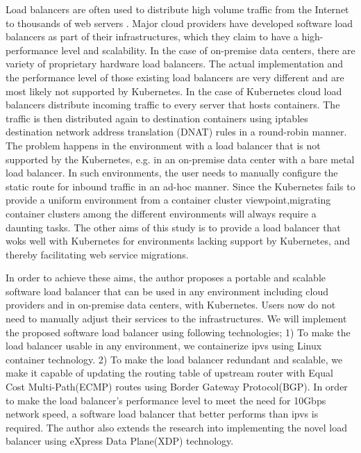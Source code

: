 Load balancers are often used to distribute high volume traffic from the Internet to thousands of web servers .
Major cloud providers have developed software load balancers\cite{eisenbud2016maglev,patel2013ananta} as part of their infrastructures, which they claim to have a high-performance level and scalability.
In the case of on-premise data centers, there are variety of proprietary hardware load balancers.
The actual implementation and the performance level of those existing load balancers are very different and are most likely not supported by Kubernetes.
%
In the case of Kubernetes cloud load balancers distribute incoming traffic to every server that hosts containers.
The traffic is then distributed again to destination containers using iptables destination 
network address translation (DNAT)\cite{MartinA.Brown2017,Marmol2015} rules in a round-robin manner. 
The problem happens in the environment with a load balancer that is not supported by the Kubernetes, e.g. in an on-premise data center with a bare metal load balancer. 
In such environments, the user needs to manually configure the static route for inbound traffic in an ad-hoc manner. 
Since the Kubernetes fails to provide a uniform environment from a container cluster viewpoint,migrating container clusters among the different environments will always require a daunting tasks.
The other aims of this study is to provide a load balancer that woks well with Kubernetes for environments lacking support by Kubernetes, and thereby facilitating web service migrations.

In order to achieve these aims, the author proposes a portable and scalable software load balancer that can be used in any environment including cloud providers and in on-premise data centers, with Kubernetes.
Users now do not need to manually adjust their services to the infrastructures.
We will implement the proposed software load balancer using following technologies;
1) To make the load balancer usable in any environment, we containerize ipvs\cite{Zhang2000} using Linux container technology\cite{menage2007adding}.
2) To make the load balancer redundant and scalable, we make it capable of updating the routing table of upstream router with Equal Cost Multi-Path(ECMP) routes\cite{al2008scalable} using Border Gateway Protocol(BGP).
In order to make the load balancer's performance level to meet the need for 10Gbps network speed, a software load balancer that better performs than ipvs is required.
The author also extends the research into implementing the novel load balancer using eXpress Data Plane(XDP) technology\cite{bertin2017xdp}.

